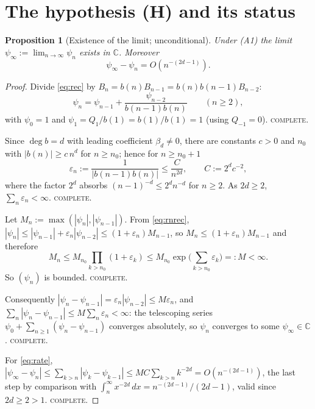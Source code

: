 \documentclass[11pt]{article}
\newtheorem{proposition}[theorem]{Proposition}
\theoremstyle{definition}
\newcommand{\bd}{\beta_d}
\newcommand{\psiinf}{\psi_\infty}
\newcommand{\C}{\mathbb{C}}
\begin{document}
\section{The hypothesis (H) and its status}

\begin{proposition}[Existence of the limit; unconditional]\label{prop:exists}
Under \textup{(A1)} the limit $\psiinf:=\lim_{n\to\infty}\psi_n$ exists in $\C$.
Moreover
\begin{equation}\label{eq:rate}
\psiinf-\psi_n=O\!\left(n^{-(2d-1)}\right).
\end{equation}
\end{proposition}

\begin{proof}
Divide \eqref{eq:rec} by $B_n=b(n)B_{n-1}=b(n)b(n-1)B_{n-2}$:
\begin{equation}\label{eq:rnrec}
\psi_n=\psi_{n-1}+\frac{\psi_{n-2}}{b(n-1)b(n)}\qquad(n\ge2),
\end{equation}
with $\psi_0=1$ and $\psi_1=Q_1/b(1)=b(1)/b(1)=1$ (using $Q_{-1}=0$).
\textsc{complete.}

Since $\deg b=d$ with leading coefficient $\bd\neq0$, there are constants
$c>0$ and $n_0$ with $|b(n)|\ge c\,n^{d}$ for $n\ge n_0$; hence for $n\ge n_0+1$
\begin{equation}\label{eq:eps}
\varepsilon_n:=\frac{1}{|b(n-1)b(n)|}\le \frac{C}{n^{2d}},\qquad C:=2^{d}c^{-2},
\end{equation}
where the factor $2^d$ absorbs $(n-1)^{-d}\le 2^d n^{-d}$ for $n\ge2$.
As $2d\ge2$, $\sum_n\varepsilon_n<\infty$. \textsc{complete.}

Let $M_n:=\max(|\psi_n|,|\psi_{n-1}|)$. From \eqref{eq:rnrec},
$|\psi_n|\le|\psi_{n-1}|+\varepsilon_n|\psi_{n-2}|\le(1+\varepsilon_n)M_{n-1}$, so
$M_n\le(1+\varepsilon_n)M_{n-1}$ and therefore
\[
M_n\le M_{n_0}\prod_{k>n_0}(1+\varepsilon_k)\le
M_{n_0}\exp\Big(\sum_{k>n_0}\varepsilon_k\Big)=:M<\infty .
\]
So $(\psi_n)$ is bounded. \textsc{complete.}

Consequently $|\psi_n-\psi_{n-1}|=\varepsilon_n|\psi_{n-2}|\le M\varepsilon_n$, and
$\sum_n|\psi_n-\psi_{n-1}|\le M\sum_n\varepsilon_n<\infty$: the telescoping series
$\psi_0+\sum_{n\ge1}(\psi_n-\psi_{n-1})$ converges absolutely, so $\psi_n$ converges to some
$\psiinf\in\C$. \textsc{complete.}

For \eqref{eq:rate}, $|\psiinf-\psi_n|\le\sum_{k>n}|\psi_k-\psi_{k-1}|
\le MC\sum_{k>n}k^{-2d}=O(n^{-(2d-1)})$, the last step by comparison with
$\int_n^\infty x^{-2d}\,dx=n^{-(2d-1)}/(2d-1)$, valid since $2d\ge2>1$.
\textsc{complete.}
\end{proof}
\end{document}
